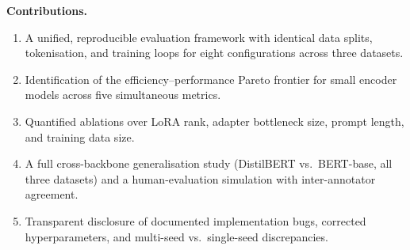 \documentclass[conference]{IEEEtran}
\begin{document}
\textbf{Contributions.}
\begin{enumerate}
  \item A unified, reproducible evaluation framework with identical data splits, tokenisation, and training loops for eight configurations across three datasets.
  \item Identification of the efficiency--performance Pareto frontier for small encoder models across five simultaneous metrics.
  \item Quantified ablations over LoRA rank, adapter bottleneck size, prompt length, and training data size.
  \item A full cross-backbone generalisation study (DistilBERT vs.\ BERT-base, all three datasets) and a human-evaluation simulation with inter-annotator agreement.
  \item Transparent disclosure of documented implementation bugs, corrected hyperparameters, and multi-seed vs.\ single-seed discrepancies.
\end{enumerate}
\end{document}

